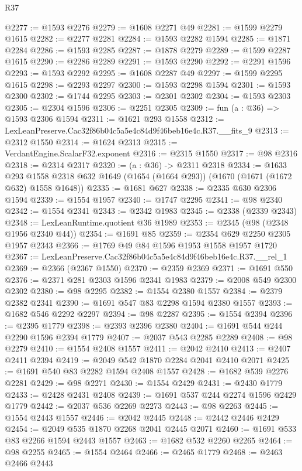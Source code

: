 \begin{lexlean}{R37}
\begin{coremodule}
@2277 := @1593 @2276
@2279 := @1608 @2271 @49
@2281 := @1599 @2279 @1615
@2282 := @2277 @2281
@2284 := @1593 @2282 @1594
@2285 := @1871 @2284
@2286 := @1593 @2285
@2287 := @1878 @2279
@2289 := @1599 @2287 @1615
@2290 := @2286 @2289
@2291 := @1593 @2290
@2292 := @2291 @1596
@2293 := @1593 @2292
@2295 := @1608 @2287 @49
@2297 := @1599 @2295 @1615
@2298 := @2293 @2297
@2300 := @1593 @2298 @1594
@2301 := @1593 @2300
@2302 := @1744 @2295
@2303 := @2301 @2302
@2304 := @1593 @2303
@2305 := @2304 @1596
@2306 := @2251 @2305
@2309 := fun (a : @36) => @1593 @2306 @1594
@2311 := @1621 @293 @1558
@2312 := LexLeanPreserve.Cac32f86b04c5a5e4c84d9f46beb16e4c.R37.__fits_9
@2313 := @2312 @1550
@2314 := @1624 @2313
@2315 := VerdantEngine.ScalarF32.exponent
@2316 := @2315 @1550
@2317 := @98 @2316
@2318 := @2314 @2317
@2320 := (a : @36) -> @2311 @2318
@2334 := @1633
    @293
    @1558
    @2318
    @632
    @1649
    (@1654 (@1664 @293))
    (@1670 (@1671 (@1672 @632) @1558 @1648))
@2335 := @1681 @627
@2338 := @2335 @630 @2306 @1594
@2339 := @1554 @1957
@2340 := @1747 @2295
@2341 := @98 @2340
@2342 := @1554 @2341
@2343 := @2342 @1983
@2345 := @2338 (@2339 @2343)
@2348 := LexLeanRuntime.quotient @36 @1989
@2353 := @2345 (@98 (@2348 @1956 @2340 @44))
@2354 := @1691 @85
@2359 := @2354 @629 @2250 @2305 @1957 @2343
@2366 := @1769 @49 @84 @1596 @1953 @1558 @1957 @1720
@2367 := LexLeanPreserve.Cac32f86b04c5a5e4c84d9f46beb16e4c.R37.__rel_1
@2369 := @2366 (@2367 @1550)
@2370 := @2359 @2369
@2371 := @1691 @550
@2376 := @2371 @281 @2303 @1596 @2341 @1983
@2379 := @2008 @549 @2300 @2302
@2380 := @98 @2295
@2382 := @1554 @2380 @1557
@2384 := @2379 @2382 @2341
@2390 := @1691 @547 @83 @2298 @1594 @2380 @1557
@2393 := @1682 @546 @2292 @2297
@2394 := @98 @2287
@2395 := @1554 @2394
@2396 := @2395 @1779
@2398 := @2393 @2396 @2380
@2404 := @1691 @544 @244 @2290 @1596 @2394 @1779
@2407 := @2037 @543 @2285 @2289
@2408 := @98 @2279
@2410 := @1554 @2408 @1557
@2411 := @2042 @2410
@2413 := @2407 @2411 @2394
@2419 := @2049 @542 @1870 @2284 @2041 @2410 @2071
@2425 := @1691 @540 @83 @2282 @1594 @2408 @1557
@2428 := @1682 @539 @2276 @2281
@2429 := @98 @2271
@2430 := @1554 @2429
@2431 := @2430 @1779
@2433 := @2428 @2431 @2408
@2439 := @1691 @537 @244 @2274 @1596 @2429 @1779
@2442 := @2037 @536 @2269 @2273
@2443 := @98 @2263
@2445 := @1554 @2443 @1557
@2446 := @2042 @2445
@2448 := @2442 @2446 @2429
@2454 := @2049 @535 @1870 @2268 @2041 @2445 @2071
@2460 := @1691 @533 @83 @2266 @1594 @2443 @1557
@2463 := @1682 @532 @2260 @2265
@2464 := @98 @2255
@2465 := @1554 @2464
@2466 := @2465 @1779
@2468 := @2463 @2466 @2443

\end{coremodule}
\end{lexlean}

